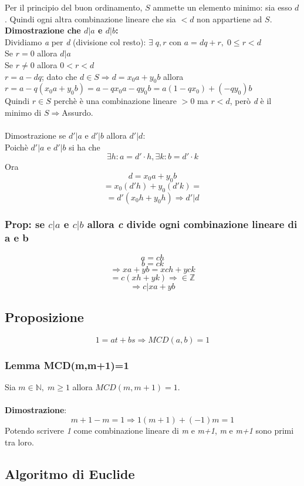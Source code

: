 Per il principio del buon ordinamento, $S$ ammette un elemento minimo: sia esso $d$.
Quindi ogni altra combinazione lineare che sia $<d$ non appartiene ad $S$.
\\\textbf{Dimostrazione che \(d|a\) e \(d|b\):}
\\
Dividiamo \textit{a} per \textit{d} (divisione col resto):
\(\exists\; q,r\) con \(a=dq+r,\; 0\leq r<d\)
\\
Se \(r=0\) allora \(d|a\)
\\
Se \(r\neq 0\) allora \(0<r<d\)
\\
\(r=a-dq\); dato che \(d\in S\Rightarrow d=x_0a+y_0b\) allora
\\ \(r=a-q(x_0a+y_0b)=a-qx_0a-qy_0b=a(1-qx_0)+(-qy_0)b\)
\\
Quindi \(r\in S\) perchè è una combinazione lineare \(>0\) ma \(r<d\), però \textit{d} è il minimo di \(S\Rightarrow\)Assurdo.
\\\\
Dimostrazione se \(d'|a\) e \(d'|b\) allora \(d'|d\):
\\
Poichè \(d'|a\) e \(d'|b\) si ha che
\[\exists h:a=d'\cdot h, \exists k:b=d'\cdot k\]
Ora \[d=x_0a+y_0b\]
\[=x_0(d'h)+y_0(d'k)=\]
\[=d'(x_0h+y_0h)\Rightarrow d'|d\]

\subsubsection{Prop: se \(c|a\) e \(c|b\) allora \textit{c} divide ogni combinazione lineare di a e b}
\[a=ch\]
\[b=ck\]
\[\Rightarrow xa+yb=xch+yck\]
\[=c(xh+yk)\Rightarrow\in\mathbb{Z}\]
\[\Rightarrow c|xa+yb\]

\subsection{Proposizione}
\[1=at+bs\Rightarrow MCD(a,b)=1\]

\subsubsection{Lemma MCD(m,m+1)=1}
Sia \(m\in\mathbb{N},\; m\geq 1\) allora \(MCD(m,m+1)=1\).
\\\\
\textbf{Dimostrazione}: \[m+1-m=1\Rightarrow 1(m+1)+(-1)m=1\]
Potendo scrivere \textit{1} come combinazione lineare di \textit{m} e \textit{m+1}, \textit{m} e \textit{m+1} sono primi tra loro.

\subsection{Algoritmo di Euclide}

